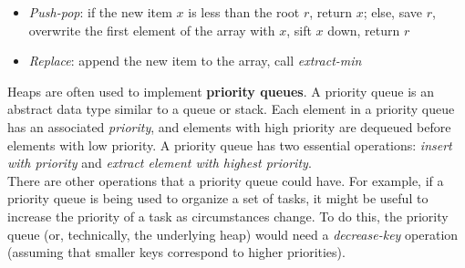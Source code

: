 \documentclass[12pt, titlepage]{article}
\begin{document}
\begin{itemize}
  \item \textit{Push-pop}: if the new item $x$ is less than the root $r$, return $x$; else, save $r$, overwrite the first element of the array with $x$, sift $x$ down, return $r$
  \item \textit{Replace}: append the new item to the array, call \textit{extract-min}
\end{itemize}

Heaps are often used to implement \textbf{priority queues}. A priority queue is an abstract data type similar to a queue or stack. Each element in a priority queue has an associated \textit{priority}, and elements with high priority are dequeued before elements with low priority. A priority queue has two essential operations: \textit{insert with priority} and \textit{extract element with highest priority}. \\

There are other operations that a priority queue could have. For example, if a priority queue is being used to organize a set of tasks, it might be useful to increase the priority of a task as circumstances change. To do this, the priority queue (or, technically, the underlying heap) would need a \textit{decrease-key} operation (assuming that smaller keys correspond to higher priorities). \\
\end{document}
